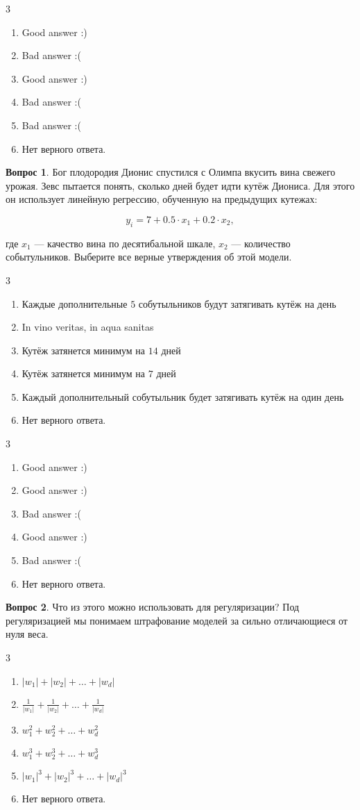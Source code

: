 \documentclass[12pt]{article}
\newenvironment{answerlist}[1][3]{
\begin{multicols}{#1}

\begin{enumerate}[label=\fbox{\emph{\Alph*}},ref=\emph{\alph*}]
}
{
\item Нет верного ответа.
\end{enumerate}
\end{multicols}
}
\theoremstyle{definition}
\newtheorem{question}{Вопрос}
\begin{document}
\begin{solution}
\begin{answerlist}
  \item Good answer :)
  \item Bad answer :(
  \item Good answer :)
  \item Bad answer :(
  \item Bad answer :(
\end{answerlist}
\end{solution}


\begin{question}
Бог плодородия Дионис спустился с Олимпа вкусить вина свежего урожая. Зевс пытается понять, сколько дней будет идти кутёж Диониса. Для этого он использует линейную регрессию, обученную на предыдущих кутежах:

\[ 
y_i = 7 + 0.5 \cdot x_1 + 0.2 \cdot x_2,
\]

где $x_1$ --- качество вина по десятибальной шкале, $x_2$ --- количество событульников. Выберите все верные утверждения об этой модели.

\begin{answerlist}
   \item  Каждые дополнительные $5$ собутыльников будут затягивать кутёж на день
   \item  In vino veritas, in aqua sanitas
   \item  Кутёж затянется минимум на $14$ дней
   \item  Кутёж затянется минимум на $7$ дней
   \item  Каждый дополнительный собутыльник будет затягивать кутёж на один день 
\end{answerlist}
\end{question}

\begin{solution}
\begin{answerlist}
  \item Good answer :)
  \item Good answer :)  
  \item Bad answer :(
  \item Good answer :)
  \item Bad answer :(
\end{answerlist}
\end{solution}

\newpage 

\begin{question}
Что из этого можно использовать для регуляризации?
Под регуляризацией мы понимаем штрафование моделей за сильно отличающиеся от нуля веса.
\begin{answerlist}
   \item  \( |w_1| + |w_2| + \ldots + |w_d| \)
   \item  \( \frac{1}{|w_1|} + \frac{1}{|w_2|} + \ldots + \frac{1}{|w_d|} \)
   \item  \( w_1^2 + w_2^2 + \ldots + w_d^2 \)
   \item  \( w_1^3 + w_2^3 + \ldots + w_d^3 \)
   \item  \( |w_1|^3 + |w_2|^3 + \ldots + |w_d|^3 \)
\end{answerlist}
\end{question}
\end{document}
